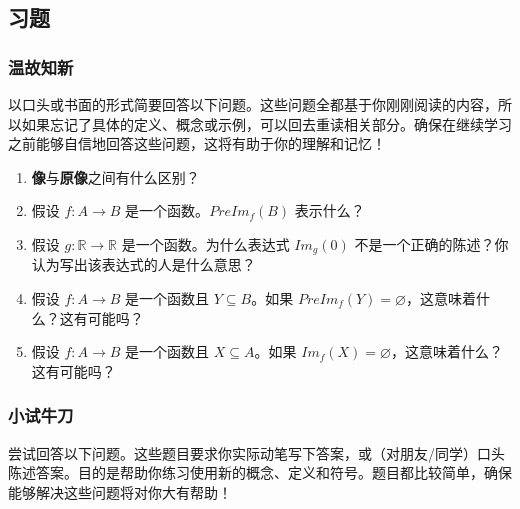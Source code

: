 
\subsection{习题}

\subsubsection*{温故知新}

以口头或书面的形式简要回答以下问题。这些问题全都基于你刚刚阅读的内容，所以如果忘记了具体的定义、概念或示例，可以回去重读相关部分。确保在继续学习之前能够自信地回答这些问题，这将有助于你的理解和记忆！

\begin{enumerate}[label=(\arabic*)]
    \item \textbf{像}与\textbf{原像}之间有什么区别？
    \item 假设 $f : A \to B$ 是一个函数。$PreIm_f (B)$ 表示什么？
    \item 假设 $g : \mathbb{R} \to \mathbb{R}$ 是一个函数。为什么表达式 $Im_g(0)$ 不是一个正确的陈述？你认为写出该表达式的人是什么意思？
    \item 假设 $f : A \to B$ 是一个函数且 $Y \subseteq B$。如果 $PreIm_f (Y) = \varnothing$，这意味着什么？这有可能吗？
    \item 假设 $f : A \to B$ 是一个函数且 $X \subseteq A$。如果 $Im_f (X) = \varnothing$，这意味着什么？这有可能吗？
\end{enumerate}

\subsubsection*{小试牛刀}

尝试回答以下问题。这些题目要求你实际动笔写下答案，或（对朋友/同学）口头陈述答案。目的是帮助你练习使用新的概念、定义和符号。题目都比较简单，确保能够解决这些问题将对你大有帮助！


